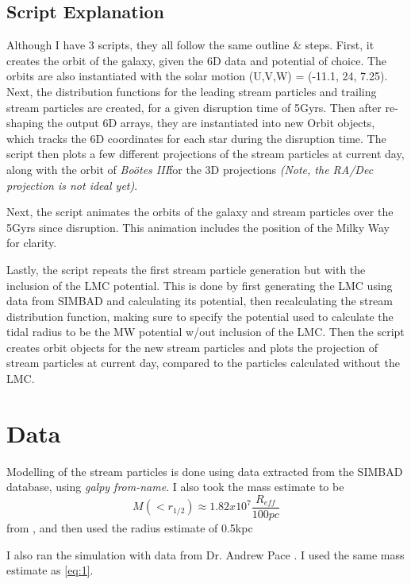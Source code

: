 \documentclass[12pt]{article}
\newcommand{\boo}{\textit{Bo\"{o}tes III}}
\begin{document}
\subsection{Script Explanation}
Although I have 3 scripts, they all follow the same outline \& steps. First, it creates the orbit of the galaxy, given the 6D data and potential of choice. The orbits are also instantiated with the solar motion (U,V,W) = (-11.1, 24, 7.25). Next, the distribution functions for the leading stream particles and trailing stream particles are created, for a given disruption time of 5Gyrs. Then after re-shaping the output 6D arrays, they are instantiated into new Orbit objects, which tracks the 6D coordinates for each star during the disruption time. The script then plots a few different projections of the stream particles at current day, along with the orbit of \boo for the 3D projections \textit{(Note, the RA/Dec projection is not ideal yet)}.

Next, the script animates the orbits of the galaxy and stream particles over the 5Gyrs since disruption. This animation includes the position of the Milky Way for clarity.

Lastly, the script repeats the first stream particle generation but with the inclusion of the LMC potential. This is done by first generating the LMC using data from SIMBAD and calculating its potential, then recalculating the stream distribution function, making sure to specify the potential used to calculate the tidal radius to be the MW potential w/out inclusion of the LMC. Then the script creates orbit objects for the new stream particles and plots the projection of stream particles at current day, compared to the particles calculated without the LMC.

\section{Data}
\label{sec:data}
Modelling of the stream particles is done using data extracted from the SIMBAD database, using \textit{galpy from-name}. I also took the mass estimate to be 
\begin{equation}
M(<r_{1/2}) \approx 1.82x10^7 \frac{R_{eff}}{100pc}
\label{eq:1}
\end{equation}
from \cite{Carlin_2009}, and then used the radius estimate of 0.5kpc \cite{Correnti_2009}

I also ran the simulation with data from Dr. Andrew Pace \cite{Pace_6D}. I used the same mass estimate as \ref{eq:1}.
\end{document}
